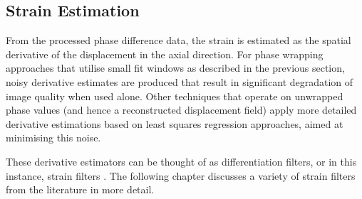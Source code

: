 \subsection{Strain Estimation}

From the processed phase difference data, the strain is estimated as the spatial derivative of the displacement in the axial direction. For phase wrapping approaches that utilise small fit windows as described in the previous section, noisy derivative estimates are produced that result in significant degradation of image quality when used alone. Other techniques that operate on unwrapped phase values (and hence a reconstructed displacement field) apply more detailed derivative estimations based on least squares regression approaches, aimed at minimising this noise.

These derivative estimators can be thought of as differentiation filters, or in this instance, strain filters \cite{lindop_general_2008} \cite{varghese_theoretical_1997}. The following chapter discusses a variety of strain filters from the literature in more detail.
